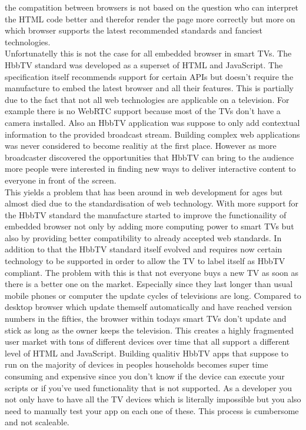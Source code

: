 the compatition between browsers is not based on the question who can interpret the HTML code better and therefor
render the page more correctly but more on which browser supports the latest recommended standards and fanciest
technologies.\\
Unfortunatelly this is not the case for all embedded browser in smart TVs. The HbbTV standard was developed as
a superset of HTML and JavaScript. The specification itself recommends support for certain APIs but doesn't
require the manufacture to embed the latest browser and all their features. This is partially due to the fact
that not all web technologies are applicable on a television. For example there is no WebRTC support because
most of the TVs don't have a camera installed. Also an HbbTV application was suppose to only add contextual
information to the provided broadcast stream. Building complex web applications was never considered to become
realitiy at the first place. However as more broadcaster discovered the opportunities that HbbTV can bring to
the audience more people were interested in finding new ways to deliver interactive content to everyone in
front of the screen.\\
This yields a problem that has been around in web development for ages but almost died due to the standardisation
of web technology. With more support for the HbbTV standard the manufacture started to improve the functionaility
of embedded browser not only by adding more computing power to smart TVs but also by providing better compatibility
to already accepted web standards. In addition to that the HbbTV standard itself evolved and requires now certain
technology to be supported in order to allow the TV to label itself as HbbTV compliant. The problem with this is
that not everyone buys a new TV as soon as there is a better one on the market. Especially since they last longer
than usual mobile phones or computer the update cycles of televisions are long. Compared to desktop browser which
update themself automatically and have reached version numbers in the fifties, the browser within todays smart
TVs don't update and stick as long as the owner keeps the television. This creates a highly fragmented
user market with tons of different devices over time that all support a different level of HTML and JavaScript.
Building qualitiv HbbTV apps that suppose to run on the majority of devices in peoples households becomes super
time consuming and expensive since you don't know if the device can execute your scripts or if you've used
functionality that is not supported. As a developer you not only have to have all the TV devices which is literally
impossible but you also need to manually test your app on each one of these. This process is cumbersome and not
scaleable.


